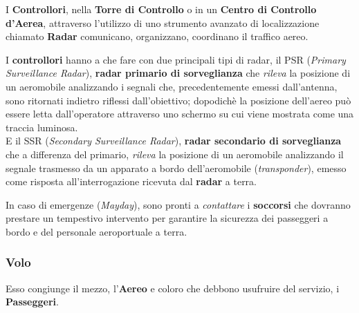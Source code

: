 \pagebreak

\textsf{\small I \textbf{Controllori}, nella \textbf{Torre di Controllo} o in un \textbf{Centro di Controllo d'Aerea}, attraverso l'utilizzo di uno strumento avanzato di localizzazione chiamato \textbf{Radar} comunicano, organizzano, coordinano il traffico aereo.}\break

\textsf{\small I \textbf{controllori} hanno a che fare con due principali tipi di radar, il PSR (\emph{Primary Surveillance Radar}), \textbf{radar primario di sorveglianza} che \emph{rileva} la posizione di un aeromobile analizzando i segnali che, precedentemente emessi dall'antenna, sono ritornati indietro riflessi dall'obiettivo; dopodichè la posizione dell'aereo può essere letta dall'operatore attraverso uno schermo su cui viene mostrata come una traccia luminosa.}\\

\textsf{\small E il SSR (\emph{Secondary Surveillance Radar}), \textbf{radar secondario di sorveglianza} che a differenza del primario, \emph{rileva} la posizione di un aeromobile analizzando il segnale trasmesso da un apparato a bordo dell'aeromobile (\emph{transponder}), emesso come risposta all'interrogazione ricevuta dal \textbf{radar} a terra.}\break

\textsf{\small In caso di emergenze (\emph{Mayday}), sono pronti a \emph{contattare} i \textbf{soccorsi} che dovranno prestare un tempestivo intervento per garantire la sicurezza dei passeggeri a bordo e del personale aeroportuale a terra. }\\


\newpage

\subsubsection{Volo}


\textsf{\small Esso congiunge il mezzo, l'\textbf{Aereo} e coloro che debbono usufruire del servizio, i \textbf{Passeggeri}.}\\

